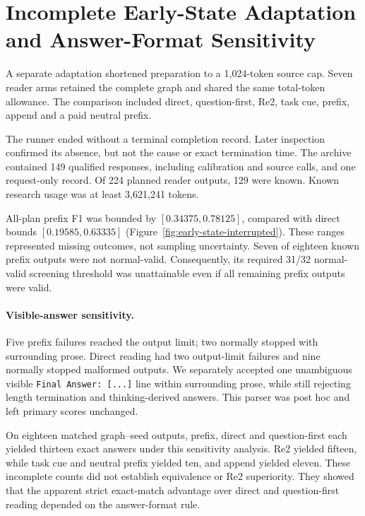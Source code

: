 \section{Incomplete Early-State Adaptation and Answer-Format Sensitivity}
\label{app:early-state-detail}
A separate adaptation shortened preparation to a 1,024-token source cap. Seven reader arms retained the complete graph and shared the same total-token allowance. The comparison included direct, question-first, Re2, task cue, prefix, append and a paid neutral prefix.

The runner ended without a terminal completion record. Later inspection confirmed its absence, but not the cause or exact termination time. The archive contained 149 qualified responses, including calibration and source calls, and one request-only record. Of 224 planned reader outputs, 129 were known. Known research usage was at least 3,621,241 tokens.

All-plan prefix F1 was bounded by $[0.34375,0.78125]$, compared with direct bounds $[0.19585,0.63335]$ (Figure~\ref{fig:early-state-interrupted}). These ranges represented missing outcomes, not sampling uncertainty. Seven of eighteen known prefix outputs were not normal-valid. Consequently, its required 31/32 normal-valid screening threshold was unattainable even if all remaining prefix outputs were valid.

\paragraph{Visible-answer sensitivity.} Five prefix failures reached the output limit; two normally stopped with surrounding prose. Direct reading had two output-limit failures and nine normally stopped malformed outputs. We separately accepted one unambiguous visible \texttt{Final Answer: [...]} line within surrounding prose, while still rejecting length termination and thinking-derived answers. This parser was post hoc and left primary scores unchanged.

On eighteen matched graph--seed outputs, prefix, direct and question-first each yielded thirteen exact answers under this sensitivity analysis. Re2 yielded fifteen, while task cue and neutral prefix yielded ten, and append yielded eleven. These incomplete counts did not establish equivalence or Re2 superiority. They showed that the apparent strict exact-match advantage over direct and question-first reading depended on the answer-format rule.

